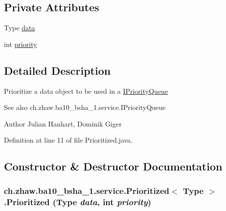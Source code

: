 \subsection*{Private Attributes}
\begin{DoxyCompactItemize}
\item 
Type \hyperlink{classch_1_1zhaw_1_1ba10__bsha__1_1_1service_1_1Prioritized_3_01Type_01_4_ac981f72cd0ff5d5ad2b9505b95e6cb27}{data}
\item 
int \hyperlink{classch_1_1zhaw_1_1ba10__bsha__1_1_1service_1_1Prioritized_3_01Type_01_4_aac367233c3f10ee7df9855347d2e5e7b}{priority}
\end{DoxyCompactItemize}


\subsection{Detailed Description}
Prioritize a data object to be used in a \hyperlink{}{IPriorityQueue}

\begin{DoxySeeAlso}{See also}
ch.zhaw.ba10\_\-bsha\_\-1.service.IPriorityQueue
\end{DoxySeeAlso}
\begin{DoxyAuthor}{Author}
Julian Hanhart, Dominik Giger 
\end{DoxyAuthor}


Definition at line 11 of file Prioritized.java.

\subsection{Constructor \& Destructor Documentation}
\hypertarget{classch_1_1zhaw_1_1ba10__bsha__1_1_1service_1_1Prioritized_3_01Type_01_4_a391e270fbbf82fc8cc9ef250b14dd4e3}{
\subsubsection[{Prioritized}]{\setlength{\rightskip}{0pt plus 5cm}ch.zhaw.ba10\_\-bsha\_\-1.service.Prioritized$<$ Type $>$.Prioritized (Type {\em data}, \/  int {\em priority})}}
\label{classch_1_1zhaw_1_1ba10__bsha__1_1_1service_1_1Prioritized_3_01Type_01_4_a391e270fbbf82fc8cc9ef250b14dd4e3}


